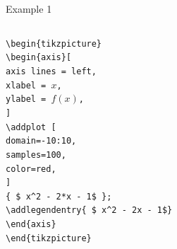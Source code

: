 \documentclass[
11pt, %
]{beamer}
\begin{document}
	
	\begin{frame}{Example 1}
    \begin{columns}[onlytextwidth] %
        \begin{column}{0.4\textwidth}
            \texttt{\textbackslash begin\{tikzpicture\}} \\
			\texttt{\textbackslash begin\{axis\}[} \\
    		\texttt{axis lines = left,} \\
    		\texttt{xlabel = \(x\),} \\
    		\texttt{ylabel = {\(f(x)\)},} \\
			\texttt{]} \\

			\texttt{\textbackslash addplot [} \\
    		\texttt{domain=-10:10,} \\
    		\texttt{samples=100,} \\
    		\texttt{color=red,} \\
		\texttt{]} \\
		\texttt{\{ \$ x\^{}2 - 2*x - 1\$ \};} \\
		\texttt{\textbackslash addlegendentry\{\ \$ x\^{}2 - 2x - 1\$\}} \\

		\texttt{\textbackslash end\{axis\}} \\
		\texttt{\textbackslash end\{tikzpicture\}} 
        \end{column}
        
        \begin{column}{0.6\textwidth}
            \begin{figure}
            \end{figure}
        \end{column}
    \end{columns}
    
	\end{frame}
	
\end{document}
